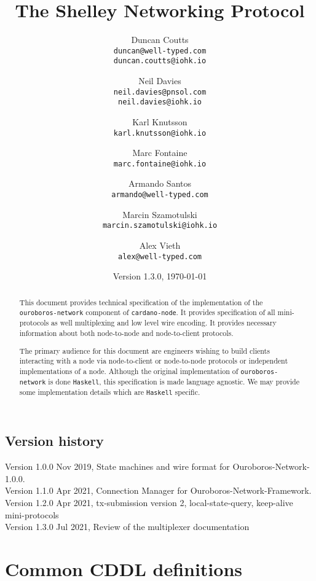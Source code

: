 \documentclass[11pt,a4paper]{report}
\begin{document}
\title{The Shelley Networking Protocol}
\author{
  Duncan Coutts \\
  {\small \texttt{duncan@well-typed.com}} \\
  {\small \texttt{duncan.coutts@iohk.io}}
\and
  Neil Davies \\
  {\small \texttt{neil.davies@pnsol.com}} \\
  {\small \texttt{neil.davies@iohk.io}}
\and
  Karl Knutsson \\
  {\small \texttt{karl.knutsson@iohk.io}}
\and
  Marc Fontaine \\
  {\small \texttt{marc.fontaine@iohk.io}}
\and
  Armando Santos \\
  {\small \texttt{armando@well-typed.com}}
\and
  Marcin Szamotulski \\
  {\small \texttt{marcin.szamotulski@iohk.io}}
\and
  Alex Vieth \\
  {\small \texttt{alex@well-typed.com}}
}
\date{{\small Version 1.3.0, \today}}

\maketitle

\begin{abstract}
  This document provides technical specification of the implementation of the
  \texttt{ouroboros-network} component of \texttt{cardano-node}. It provides specification of all
  mini-protocols as well multiplexing and low level wire encoding.  It provides
  necessary information about both node-to-node and node-to-client protocols.

  The primary audience for this document are engineers wishing to build
  clients interacting with a node via node-to-client or node-to-node protocols
  or independent implementations of a node.  Although the original
  implementation of \texttt{ouroboros-network} is done \texttt{Haskell}, this specification is
  made language agnostic. We may provide some implementation details which are
  \texttt{Haskell} specific.
\end{abstract}

\tableofcontents

\section*{Version history}

\begin{description}
\item[Version 1.0.0 Nov 2019, State machines and wire format for Ouroboros-Network-1.0.0.]
\item[Version 1.1.0 Apr 2021, Connection Manager for Ouroboros-Network-Framework.]
\item[Version 1.2.0 Apr 2021, tx-submission version 2, local-state-query, keep-alive mini-protocols]
\item[Version 1.3.0 Jul 2021, Review of the multiplexer documentation]
\end{description}
% 




% 

\appendix
\chapter{Common CDDL definitions}
\label{cddl-common}




\end{document}
